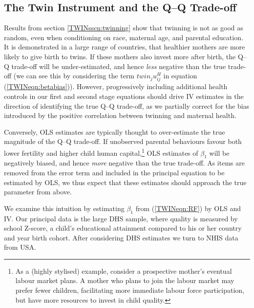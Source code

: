 \documentclass[subeqn]{article}
\begin{document}
\begin{spacing}{1.4}
\subsection{The Twin Instrument and the Q--Q Trade-off} \label{TWINsscn:QQtwins}
Results from section \ref{TWINsscn:twinning} show that twinning is not as good
as random, even when conditioning on race, maternal age, and parental education. 
It is demonstrated in a large range of countries, that healthier mothers are 
more likely to give birth to twins. If these mothers also invest more after 
birth, the Q--Q trade-off will be under-estimated, and hence \emph{less} 
negative than the true trade-off (we can see this by considering the term 
$twin_ju^H_{ij}$ in equation (\ref{TWINeqn:betabias})). However, progressively 
including additional health controls in our first and second stage equations 
should drive IV estimates in the direction of identifying the true Q--Q 
trade-off, as we partially correct for the bias introduced by the positive 
correlation between twinning and maternal health.

Conversely, OLS estimates are typically thought to over-estimate the true 
magnitude of the Q--Q trade-off.  If unobserved parental behaviours favour both
lower fertility and higher child human capital,\footnote{As a (highly stylised) 
example, consider a prospective mother's eventual labour market plans. A mother 
who plans to join the labour market may prefer fewer children, facilitating more 
immediate labour force participation, but have more resources to invest in child
quality.} OLS estimates of $\beta_1$ will be negatively biased, and hence 
\emph{more} negative than the true trade-off.  As items are removed from the
error term and included in the principal equation to be estimated by OLS, we thus 
expect that these estimates should approach the true parameter from above.

We examine this intuition by estimating $\beta_1$ from (\ref{TWINeqn:RF}) by OLS 
and IV. Our principal data is the large DHS sample, where quality is measured by
school Z-score, a child's educational attainment compared to his or her 
country and year birth cohort.  After considering DHS estimates we turn to 
NHIS data from USA.


\end{spacing}
\end{document}
